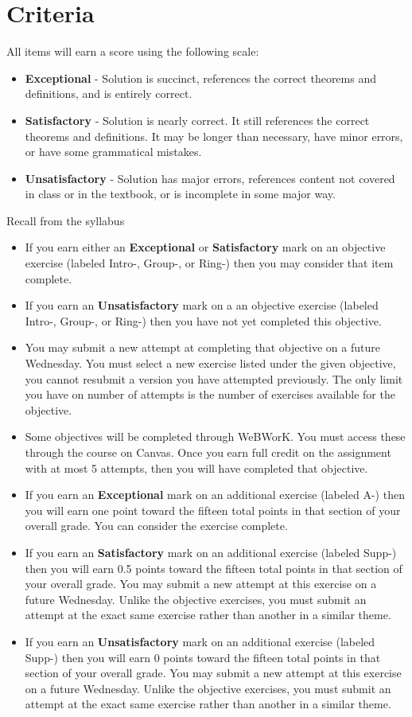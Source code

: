 \documentclass[12pt]{article}
\begin{document}
	\section*{Criteria}
	All items will earn a score using the following scale:
	\begin{itemize}
		\item \textbf{Exceptional} - Solution is succinct, references the correct theorems and definitions, and is entirely correct.
		\item \textbf{Satisfactory} - Solution is nearly correct. It still references the correct theorems and definitions. 
		It may be longer than necessary, have minor errors, or have some grammatical mistakes.
		\item \textbf{Unsatisfactory} - Solution has major errors, references content not covered in class or in the textbook, or is incomplete in some major way.
	\end{itemize}
	Recall from the syllabus
	\begin{itemize}
		\item If you earn either an \textbf{Exceptional} or \textbf{Satisfactory} mark on an objective exercise (labeled Intro-, Group-, or Ring-) then you may consider that item complete. 
		\item If you earn an \textbf{Unsatisfactory} mark on a an objective exercise (labeled Intro-, Group-, or Ring-) then you have not yet completed this objective.
		\item You may submit a new attempt at completing that objective on a future Wednesday. You must select a new exercise listed under the given objective, you cannot resubmit a version you have attempted previously.  The only limit you have on number of attempts is the number of exercises available for the objective.
		\item Some objectives will be completed through WeBWorK.  You must access these through the course on Canvas. Once you earn full credit on the assignment with at most 5 attempts, then you will have completed that objective.
		\item If you earn an \textbf{Exceptional} mark on an additional exercise (labeled A-) then you will earn one point toward the fifteen total points in that section of your overall grade. You can consider the exercise complete.
		\item If you earn an \textbf{Satisfactory} mark on an additional exercise (labeled Supp-) then you will earn 0.5 points toward the fifteen total points in that section of your overall grade. You may submit a new attempt at this exercise on a future Wednesday. Unlike the objective exercises, you must submit an attempt at the exact same exercise rather than another in a similar theme.
		\item If you earn an \textbf{Unsatisfactory} mark on an additional exercise (labeled Supp-) then you will earn 0 points toward the fifteen total points in that section of your overall grade. You may submit a new attempt at this exercise on a future Wednesday. Unlike the objective exercises, you must submit an attempt at the exact same exercise rather than another in a similar theme.
	\end{itemize}
	
\end{document}

